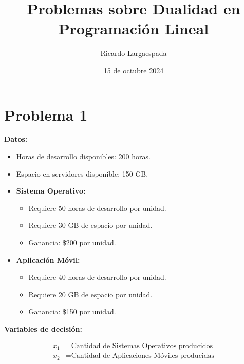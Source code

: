 \documentclass{article}
\title{Problemas sobre Dualidad en Programación Lineal}
\author{Ricardo Largaespada}
\date{15 de octubre 2024}
\begin{document}
\maketitle

\section*{Problema 1}

\textbf{Datos:}

\begin{multicols}{2}
\begin{itemize}
    \item Horas de desarrollo disponibles: 200 horas.
    \item Espacio en servidores disponible: 150 GB.
    \item \textbf{Sistema Operativo:}
    \begin{itemize}
        \item Requiere 50 horas de desarrollo por unidad.
        \item Requiere 30 GB de espacio por unidad.
        \item Ganancia: \$200 por unidad.
    \end{itemize}
    \item \textbf{Aplicación Móvil:}
    \begin{itemize}
        \item Requiere 40 horas de desarrollo por unidad.
        \item Requiere 20 GB de espacio por unidad.
        \item Ganancia: \$150 por unidad.
    \end{itemize}
\end{itemize}

\textbf{Variables de decisión:}

\[
\begin{aligned}
x_1 &= \text{Cantidad de Sistemas Operativos producidos} \\
x_2 &= \text{Cantidad de Aplicaciones Móviles producidas}
\end{aligned}
\]
\end{multicols}
\end{document}
